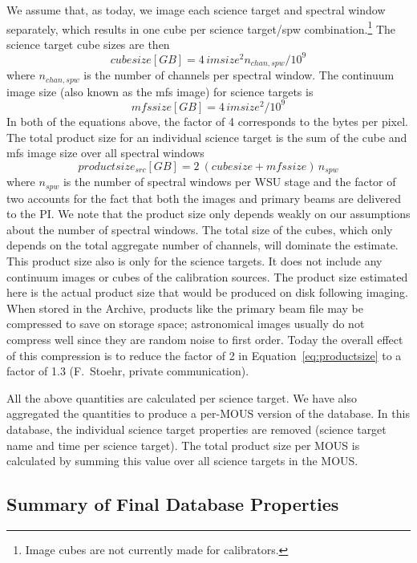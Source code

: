 \documentclass[preprint]{aastex631}
\begin{document}
We assume that, as today, we image each science target  and spectral window separately, which results in one cube per science target/spw combination.\footnote{Image cubes are not  currently made for calibrators.} The science target cube sizes are then
\begin{equation}
cubesize[GB] = 4 \, imsize^2 n_{chan,spw} /10^9
\end{equation}
where $n_{chan,spw}$ is the number of channels per spectral window. The continuum image size (also known as the mfs image) for science targets is
\begin{equation}
mfssize[GB] = 4 \, imsize^2 /10^9
\end{equation}
In both of the equations above, the factor of 4 corresponds to the bytes per pixel. The total product size for an individual science target is the sum of the cube and mfs image size over all spectral windows 
\begin{equation} \label{eq:productsize}
productsize_{src}[GB] = 2 \ (cubesize + mfssize) \, n_{spw} 
\end{equation}
where $n_{spw}$ is the number of spectral windows per WSU stage and the factor of two accounts for the fact that both the images and primary beams are delivered to the PI. We note that the product size only depends weakly on our assumptions about the number of spectral windows. The total size of the cubes, which only depends on the total aggregate number of channels, will dominate the estimate. This product size also is only for the science targets. It does not include any continuum images or cubes of the calibration sources. The product size estimated here is the actual product size that would be produced on disk following imaging. When stored in the Archive, products like the primary beam file may be compressed to save on storage space; astronomical images usually do not compress well since they are  random noise to first order. Today the overall effect of this compression is to reduce the factor of 2 in Equation~\ref{eq:productsize} to a factor of 1.3 (F.\ Stoehr, private communication).

All the above quantities are calculated per science target. We have also  aggregated the quantities to produce a per-MOUS version of the database. In this database, the individual science target properties are removed (science target name and time per science target). The total product size per MOUS is calculated by summing this value over all science targets in the MOUS.


\subsection{Summary of Final Database Properties} \label{sec:database_properties}
\end{document}
